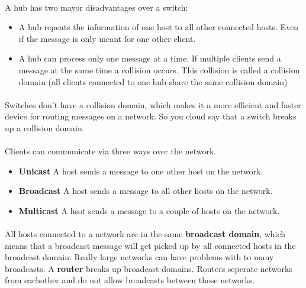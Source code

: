 \documentclass[10pt,landscape]{article}
\begin{document}
\begin{multicols}{3}
\paragraph{}
A hub has two mayor disadvantages over a switch:
\begin{itemize}
	\item A hub repeats the information of one host to all other connected hosts. Even if the message is only meant for one
	other client.
	\item A hub can process only one message at a time. If multiple clients send a message at the same time a collision occurs.
	This collision is called a collision domain (all clients connected to one hub share the same collision domain)
\end{itemize}
\paragraph{}
Switches don't have a collision domain, which makes it a more efficient and faster device for routing messages on a network.
So you cloud say that a switch breaks up a collision domain.
\paragraph{}
Clients can communicate via three ways over the network.
\begin{itemize}
	\item \textbf{Unicast} A host sends a message to one other host on the network.
	\item \textbf{Broadcast} A host sends a message to all other hosts on the network.
	\item \textbf{Multicast} A hsot sends a message to a couple of hosts on the network.
\end{itemize}
\paragraph{}
All hosts connected to a network are in the same \textbf{broadcast domain}, which means that a broadcast message will get picked
up by all connected hosts in the broadcast domain. Really large networks can have problems with to many broadcasts. A \textbf{router}
breaks up broadcast domains. Routers seperate networks from eachother and do not allow broadcasts between those networks.

\end{multicols}
\end{document}
